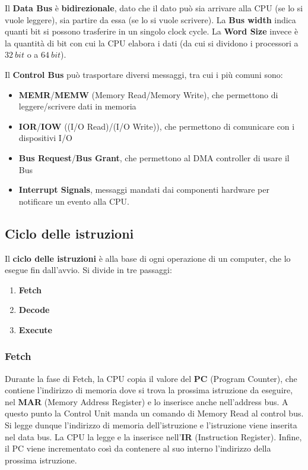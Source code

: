 \documentclass[11pt, a4paper, titlepage, oneside]{scrbook}
\begin{document}
Il \textbf{Data Bus} è \textbf{bidirezionale}, dato che il dato può sia arrivare alla CPU (se lo si vuole leggere), sia partire da essa (se lo si vuole scrivere). La \textbf{Bus width} indica quanti bit si possono trasferire in un singolo clock cycle. La \textbf{Word Size} invece è la quantità di bit con cui la CPU elabora i dati (da cui si dividono i processori a $\SI{32}{bit}$ o a $\SI{64}{bit}$). 

Il \textbf{Control Bus} può trasportare diversi messaggi, tra cui i più comuni sono:
\begin{itemize}
    \item \textbf{MEMR}/\textbf{MEMW} (Memory Read/Memory Write), che permettono di leggere/scrivere dati in memoria
    \item \textbf{IOR}/\textbf{IOW} ((I/O Read)/(I/O Write)), che permettono di comunicare con i dispositivi I/O
    \item \textbf{Bus Request}/\textbf{Bus Grant}, che permettono al DMA controller di usare il Bus
    \item \textbf{Interrupt Signals}, messaggi mandati dai componenti hardware per notificare un evento alla CPU. 
\end{itemize}

\subsection{Ciclo delle istruzioni}

\begin{Definizione}
\label{def-ciclo-istruzioni}
Il \textbf{ciclo delle istruzioni} è alla base di ogni operazione di un computer, che lo esegue fin dall'avvio. Si divide in tre passaggi:
\begin{enumerate}[label=\arabic*°]
    \item \textbf{Fetch}
    \item \textbf{Decode}
    \item \textbf{Execute}
\end{enumerate}
\end{Definizione}

\subsubsection*{Fetch}

Durante la fase di Fetch, la CPU copia il valore del \textbf{PC} (Program Counter), che contiene l'indirizzo di memoria dove si trova la prossima istruzione da eseguire, nel \textbf{MAR} (Memory Address Register) e lo inserisce anche nell'address bus. A questo punto la Control Unit manda un comando di Memory Read al control bus. Si legge dunque l'indirizzo di memoria dell'istruzione e l'istruzione viene inserita nel data bus. La CPU la legge e la inserisce nell'\textbf{IR} (Instruction Register). Infine, il PC viene incrementato così da contenere al suo interno l'indirizzo della prossima istruzione.
\end{document}
